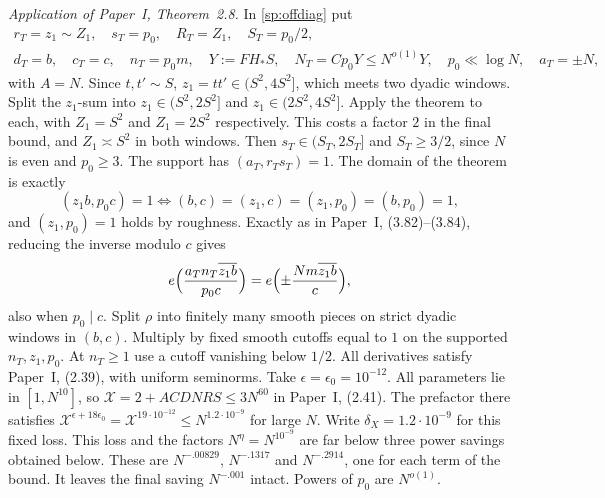 \emph{Application of Paper~I, Theorem~2.8.} In \eqref{sp:offdiag} put
\begin{equation}\label{sp:t28-map}
\begin{gathered}
 r_T=z_1\sim Z_1,\quad s_T=p_0,\quad R_T=Z_1,\quad S_T=p_0/2,\\
 d_T=b,\quad c_T=c,\quad n_T=p_0m,\quad
 Y:=FH_*S,\quad N_T=Cp_0Y\le N^{o(1)}Y,\quad p_0\ll\log N,\quad a_T=\pm N,
\end{gathered}
\end{equation}
with $A=N$. Since $t,t'\sim S$, $z_1=tt'\in(S^2,4S^2]$, which meets two
dyadic windows. Split the $z_1$-sum into $z_1\in(S^2,2S^2]$ and
$z_1\in(2S^2,4S^2]$. Apply the theorem to each, with $Z_1=S^2$ and
$Z_1=2S^2$ respectively. This costs a factor $2$ in the final bound, and
$Z_1\asymp S^2$ in both windows. Then $s_T\in(S_T,2S_T]$ and $S_T\ge3/2$,
since $N$ is even and $p_0\ge3$. The support has $(a_T,r_Ts_T)=1$. The
domain of the theorem is exactly
\[
 (z_1b,p_0c)=1\iff(b,c)=(z_1,c)=(z_1,p_0)=(b,p_0)=1,
\]
and $(z_1,p_0)=1$ holds by roughness. Exactly as in Paper~I,
(3.82)--(3.84), reducing the inverse modulo $c$ gives
\[
 e\Bigl(\frac{a_Tn_T\overline{z_1b}}{p_0c}\Bigr)=e\Bigl(\pm\frac{Nm\overline{z_1b}}c\Bigr),
\]
also when $p_0\mid c$. Split $\rho$ into finitely many smooth pieces on
strict dyadic windows in $(b,c)$. Multiply by fixed smooth cutoffs
equal to $1$ on the supported $n_T,z_1,p_0$. At $n_T\ge1$ use a cutoff
vanishing below $1/2$. All derivatives satisfy Paper~I, (2.39), with
uniform seminorms. Take $\epsilon=\epsilon_0=10^{-12}$. All parameters lie
in $[1,N^{10}]$, so $\mathcal X=2+ACDNRS\le3N^{60}$ in Paper~I, (2.41).
The prefactor there satisfies
$\mathcal X^{\epsilon+18\epsilon_0}=\mathcal X^{19\cdot10^{-12}}\le N^{1.2\cdot10^{-9}}$
for large $N$. Write $\delta_X=1.2\cdot10^{-9}$ for this fixed loss.
This loss and the factors $N^{\eta}=N^{10^{-9}}$ are
far below three power savings obtained below. These are $N^{-.00829}$, $N^{-.1317}$ and $N^{-.2914}$,
one for each term of the bound. It leaves the final
saving $N^{-.001}$ intact. Powers of $p_0$ are $N^{o(1)}$.

